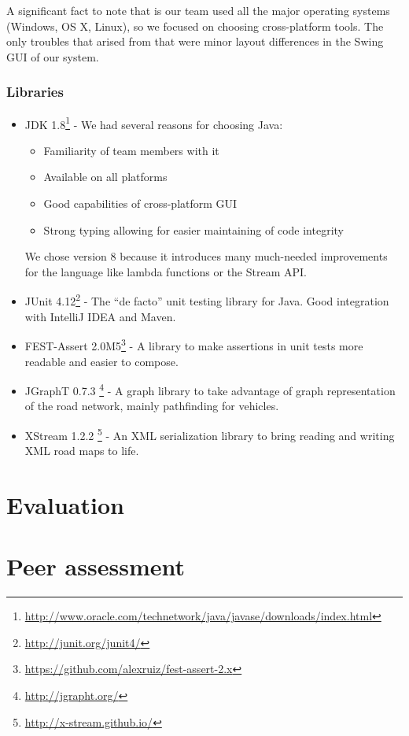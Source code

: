 \documentclass[a4paper,12pt]{article}
\begin{document}
A significant fact to note that is our team used all the major operating systems (Windows, OS X, Linux), so we focused on choosing cross-platform tools. The only troubles that arised from that were minor layout differences in the Swing GUI of our system.

\subsubsection*{Libraries}

\begin{itemize}
	\item JDK 1.8\footnote{\url{http://www.oracle.com/technetwork/java/javase/downloads/index.html}} - We had several reasons for choosing Java: \begin{itemize}
		\item Familiarity of team members with it
		\item Available on all platforms
		\item Good capabilities of cross-platform GUI
		\item Strong typing allowing for easier maintaining of code integrity
	\end{itemize}
	We chose version 8 because it introduces many much-needed improvements for the language like lambda functions or the Stream API.
	\item JUnit 4.12\footnote{\url{http://junit.org/junit4/}} - The ``de facto'' unit testing library for Java. Good integration with IntelliJ IDEA and Maven.
	\item FEST-Assert 2.0M5\footnote{\url{https://github.com/alexruiz/fest-assert-2.x}} - A library to make assertions in unit tests more readable and easier to compose.
	\item JGraphT 0.7.3 \footnote{\url{http://jgrapht.org/}} - A graph library to take advantage of graph representation of the road network, mainly pathfinding for vehicles.
	\item XStream 1.2.2 \footnote{\url{http://x-stream.github.io/}} - An XML serialization library to bring reading and writing XML road maps to life.
\end{itemize}



\section{Evaluation}

\section{Peer assessment}
\end{document}
